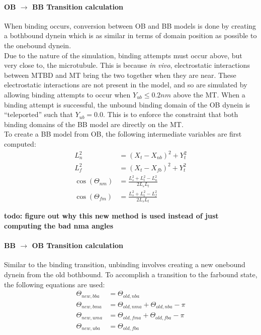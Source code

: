 \documentclass[10pt]{article} %
\begin{document}
\paragraph{OB $\rightarrow$ BB Transition calculation}
When binding occurs, conversion between OB and BB models is done by creating a bothbound dynein which is as similar in terms of domain position as possible to the onebound dynein.\\

Due to the nature of the simulation, binding attempts must occur above, but very close to, the microtubule. This is because \textit{in vivo}, electrostatic interactions between MTBD and MT bring the two together when they are near. These electrostatic interactions are not present in the model, and so are simulated by allowing binding attempts to occur when $Y_{ub} \leq 0.2nm$ above the MT. When a binding attempt is successful, the unbound binding domain of the OB dynein is ``teleported'' such that $Y_{ub} = 0.0$. This is to enforce the constraint that both binding domains of the BB model are directly on the MT.\\

To create a BB model from OB, the following intermediate variables are first computed:\\

\begin{align}
  L_n^2 &= \left(X_t - X_{nb}\right)^2 + Y_t^2\\
  L_f^2 &= \left(X_t - X_{fb}\right)^2 + Y_t^2\\
  \cos(\Theta_{nm}) &= \frac{L_s^2 + L_t^2 - L_n^2}{2L_sL_t}\\
  \cos(\Theta_{fm}) &= \frac{L_s^2 + L_t^2 - L_f^2}{2L_sL_t}
\end{align}

\textbf{todo: figure out why this new method is used instead of just computing the bad nma angles}

\paragraph{BB $\rightarrow$ OB Transition calculation}
Similar to the binding transition, unbinding involves creating a new onebound dynein from the old bothbound. To accomplish a transition to the farbound state, the following equations are used:\\

\begin{align}
  \Theta_{new,bba} &= \Theta_{old,nba}\\
  \Theta_{new,bma} &= \Theta_{old,nma} + \Theta_{old,nba} - \pi\\
  \Theta_{new,uma} &= \Theta_{old,fma} + \Theta_{old,fba} - \pi\\
  \Theta_{new,uba} &= \Theta_{old,fba}
\end{align}
\end{document}
